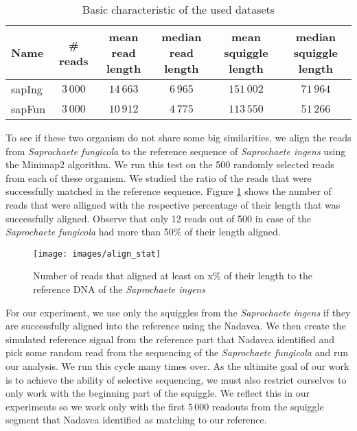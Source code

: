\begin{table}
\caption[TODO]{Basic characteristic of the used datasets}
\label{tab:datasetChar}
\begin{center}
\begin{tabular}{lccccc}
\hline 
Name & \# reads & \specialcell{mean read\\length} & \specialcell{median read\\length} & \specialcell{mean squiggle\\length} &  \specialcell{median squiggle\\length}\\
\hline
sapIng & $3\,000$ & $14\,663$ & $6\,965$ & $151\,002$ & $71\,964$ \\
sapFun & $3\,000$ & $10\,912$ & $4\,775$ & $113\,550$ & $51\,266$ \\
\hline
\end{tabular}
\end{center}
\end{table}

To see if these two organism do not share some big similarities, we align the reads from
\emph{Saprochaete fungicola} to the reference sequence of \emph{Saprochaete ingens} using the Minimap2
algorithm. We run this test on the 500 randomly selected reads from each of these organism. We studied
the ratio of the reads that were successfully matched in the reference sequence. Figure \ref{obr:align_stat}
shows the number of reads that were alligned with the respective percentage of their length that was successfully aligned.
Observe that only 12 reads out of 500 in case of the \emph{Saprochaete fungicola} had more than 50\% of their length aligned.

\begin{figure}
\centerline{\texttt{[image: images/align\_stat]}}
\caption[TODO]{Number of reads that aligned at least on x\% of their length to the reference DNA of the \emph{Saprochaete ingens}}
\label{obr:align_stat}
\end{figure}

For our experiment, we use only the squiggles from the \emph{Saprochaete ingens} if they
are successfully aligned into the reference using the Nadavca. We then create the
simulated reference signal from the reference part that Nadavca identified and pick
some random read from the sequencing of the \emph{Saprochaete fungicola} and run our analysis.
We run this cycle many times over. As the ultimite goal of our work is to achieve
the ability of selective sequencing, we must also restrict ourselves to only work with
the beginning part of the squiggle. We reflect this in our experiments so we
work only with the first $5\,000$ readouts from the squiggle segment that Nadavca identified
as matching to our reference.

